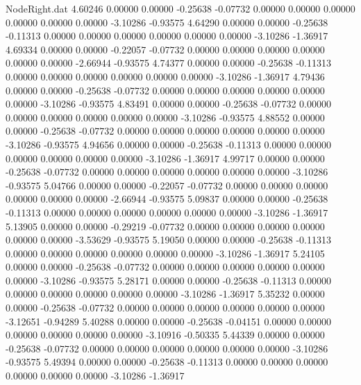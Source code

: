 \begin{filecontents}{NodeRight.dat}
   4.60246    0.00000    0.00000    -0.25638   -0.07732    0.00000    0.00000    0.00000    0.00000    0.00000    0.00000   -3.10286   -0.93575
   4.64290    0.00000    0.00000    -0.25638   -0.11313    0.00000    0.00000    0.00000    0.00000    0.00000    0.00000   -3.10286   -1.36917
   4.69334    0.00000    0.00000    -0.22057   -0.07732    0.00000    0.00000    0.00000    0.00000    0.00000    0.00000   -2.66944   -0.93575
   4.74377    0.00000    0.00000    -0.25638   -0.11313    0.00000    0.00000    0.00000    0.00000    0.00000    0.00000   -3.10286   -1.36917
   4.79436    0.00000    0.00000    -0.25638   -0.07732    0.00000    0.00000    0.00000    0.00000    0.00000    0.00000   -3.10286   -0.93575
   4.83491    0.00000    0.00000    -0.25638   -0.07732    0.00000    0.00000    0.00000    0.00000    0.00000    0.00000   -3.10286   -0.93575
   4.88552    0.00000    0.00000    -0.25638   -0.07732    0.00000    0.00000    0.00000    0.00000    0.00000    0.00000   -3.10286   -0.93575
   4.94656    0.00000    0.00000    -0.25638   -0.11313    0.00000    0.00000    0.00000    0.00000    0.00000    0.00000   -3.10286   -1.36917
   4.99717    0.00000    0.00000    -0.25638   -0.07732    0.00000    0.00000    0.00000    0.00000    0.00000    0.00000   -3.10286   -0.93575
   5.04766    0.00000    0.00000    -0.22057   -0.07732    0.00000    0.00000    0.00000    0.00000    0.00000    0.00000   -2.66944   -0.93575
   5.09837    0.00000    0.00000    -0.25638   -0.11313    0.00000    0.00000    0.00000    0.00000    0.00000    0.00000   -3.10286   -1.36917
   5.13905    0.00000    0.00000    -0.29219   -0.07732    0.00000    0.00000    0.00000    0.00000    0.00000    0.00000   -3.53629   -0.93575
   5.19050    0.00000    0.00000    -0.25638   -0.11313    0.00000    0.00000    0.00000    0.00000    0.00000    0.00000   -3.10286   -1.36917
   5.24105    0.00000    0.00000    -0.25638   -0.07732    0.00000    0.00000    0.00000    0.00000    0.00000    0.00000   -3.10286   -0.93575
   5.28171    0.00000    0.00000    -0.25638   -0.11313    0.00000    0.00000    0.00000    0.00000    0.00000    0.00000   -3.10286   -1.36917
   5.35232    0.00000    0.00000    -0.25638   -0.07732    0.00000    0.00000    0.00000    0.00000    0.00000    0.00000   -3.12651   -0.94289
   5.40288    0.00000    0.00000    -0.25638   -0.04151    0.00000    0.00000    0.00000    0.00000    0.00000    0.00000   -3.10916   -0.50335
   5.44339    0.00000    0.00000    -0.25638   -0.07732    0.00000    0.00000    0.00000    0.00000    0.00000    0.00000   -3.10286   -0.93575
   5.49394    0.00000    0.00000    -0.25638   -0.11313    0.00000    0.00000    0.00000    0.00000    0.00000    0.00000   -3.10286   -1.36917

\end{filecontents}
